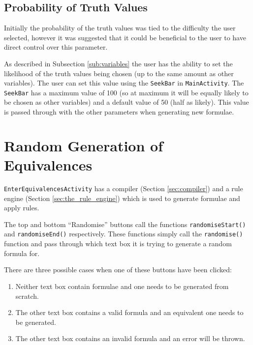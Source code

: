 \documentclass[draft]{report}
\begin{document}
\subsection{Probability of Truth Values}

Initially the probability of the truth values was tied to the difficulty the user selected, however it was suggested that it could be beneficial to the user to have direct control over this parameter. 

As described in Subsection \ref{sub:variables} the user has the ability to set the likelihood of the truth values being chosen (up to the same amount as other variables). The user can set this value using the {\tt SeekBar} in {\tt MainActivity}. The {\tt SeekBar} has a maximum value of 100 (so at maximum it will be equally likely to be chosen as other variables) and a default value of 50 (half as likely). This value is passed through with the other parameters when generating new formulae.

\section{Random Generation of Equivalences}
\label{sec:app_generation_of_equivalences}

{\tt EnterEquivalencesActivity} has a compiler (Section \ref{sec:compiler}) and a rule engine (Section \ref{sec:the_rule_engine}) which is used to generate formulae and apply rules.

The top and bottom ``Randomise'' buttons call the functions {\tt randomiseStart()} and {\tt randomiseEnd()} respectively. These functions simply call the {\tt randomise()} function and pass through which text box it is trying to generate a random formula for.

There are three possible cases when one of these buttons have been clicked:

\begin{enumerate}[leftmargin=*, align=left, label=\bfseries Case \arabic*:]
\item Neither text box contain formulae and one needs to be generated from scratch.

\item The other text box contains a valid formula and an equivalent one needs to be generated.

\item The other text box contains an invalid formula and an error will be thrown.
\end{enumerate}
\end{document}
